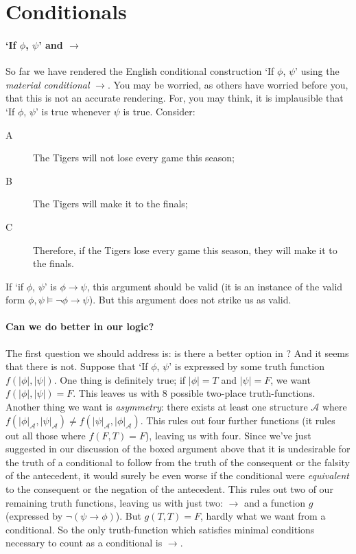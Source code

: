 

\section{Conditionals}

\paragraph{`If $\phi$, $\psi$' and $\to$}
So far we have rendered the English conditional construction `If $\phi$, $\psi$' using the \emph{material conditional} $\to$. You may be worried, as others have worried before you, that this is not an accurate rendering. For, you may think, it is implausible that `If $\phi$, $\psi$' is true whenever $\psi$ is true. Consider: \begin{description}
	\item [A] The Tigers  will not lose every game this season;
	\item [B] The Tigers will make it to the finals;
	\item [C] Therefore, if the Tigers lose every game this season, they will make it to the finals.
 \end{description}
If `if $\phi$, $\psi$' is $\phi \to \psi$, this argument should be valid (it is an instance of the valid form $\phi,\psi \vDash \neg\phi \to \psi$). But this argument does not strike us as valid. 

\paragraph{Can we do better in our logic?}
The first question we should address is: is there a better option in \lone? And it seems that there is not. Suppose that `If $\phi$, $\psi$' is expressed by some truth function $f(|\phi|,|\psi|)$. One thing is definitely true; if $|\phi|=T$ and $|\psi|=F$, we want $f(|\phi|,|\psi|)=F$. This leaves us with 8 possible two-place truth-functions. Another thing we want is \emph{asymmetry}: there exists at least one structure $\mathscr{A}$ where $f(|\phi|_{\mathscr{A}},|\psi|_{\mathscr{A}})\neq f(|\psi|_{\mathscr{A}},|\phi|_{\mathscr{A}})$. This rules out four further functions (it rules out all those where $f(F,T)=F$), leaving us with four. Since we've just suggested in our discussion of the boxed argument above that it is undesirable for the truth of a conditional to follow from the truth of the consequent or the falsity of the antecedent, it would surely be even worse if the conditional were \emph{equivalent} to the consequent or the negation of the antecedent. This rules out two of our remaining truth functions, leaving us with just two: $\to$ and a function $g$ (expressed by $\neg(\psi\to\phi)$). But $g(T,T)=F$, hardly what we want from a conditional. So the only truth-function which satisfies minimal conditions necessary to count as a conditional is $\to$.

